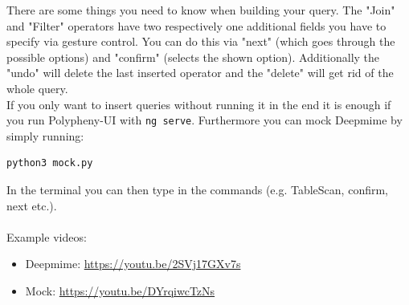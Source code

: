 There are some things you need to know when building your query. The "Join" and "Filter" operators have two respectively one additional fields you have to specify via gesture control. You can do this via "next" (which goes through the possible options) and "confirm" (selects the shown option). Additionally the "undo" will delete the last inserted operator and the "delete" will get rid of the whole query.
\\
If you only want to insert queries without running it in the end it is enough if you run Polypheny-UI with \texttt{ng serve}. Furthermore you can mock Deepmime by simply running:
\begin{lstlisting}
python3 mock.py
\end{lstlisting}
In the terminal you can then type in the commands (e.g. TableScan, confirm, next etc.).  
\\
\\
Example videos:
\begin{itemize}
    \item Deepmime: \url{https://youtu.be/2SVj17GXv7s}
    \item Mock: \url{https://youtu.be/DYrqiwcTzNs}
\end{itemize}


